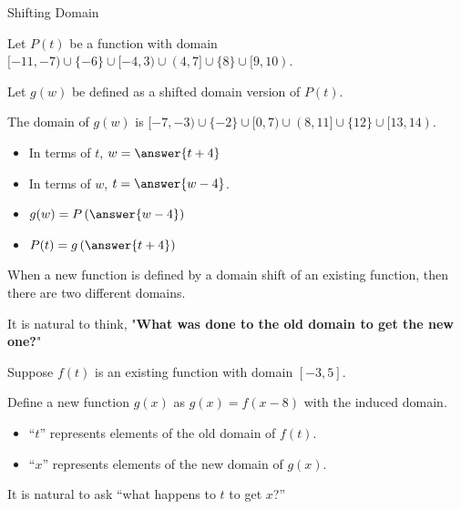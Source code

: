 \documentclass{ximera}
\begin{document}
\begin{example} Shifting Domain


Let $P(t)$ be a function with domain $[-11, -7) \cup \{ -6 \} \cup [-4,3) \cup (4, 7] \cup \{ 8 \} \cup [9, 10)$.

Let $g(w)$ be defined as a shifted domain version of $P(t)$.  

The domain of $g(w)$ is $[-7, -3) \cup \{ -2 \} \cup [0,7) \cup (8, 11] \cup \{ 12 \} \cup [13, 14)$.

\begin{itemize}
\item In terms of $t$, $w = \answer{t+4}$ 
\item In terms of $w$, $t = \answer{w-4}$.  
\end{itemize}


\begin{itemize}
\item $g(w) = P\left(\answer{w-4}\right)$ 
\item $P(t) = g\left(\answer{t+4}\right)$ 
\end{itemize}

\end{example}














When a new function is defined by a domain shift of an existing function, then there are two different domains.  


It is natural to think, "\textbf{\textcolor{purple!85!blue}{What was done to the old domain to get the new one?}}"

Suppose $f(t)$ is an existing function with domain $[-3, 5]$.

Define a new function $g(x)$ as $g(x) = f(x-8)$ with the induced domain.



\begin{itemize}
\item ``$t$'' represents elements of the old domain of $f(t)$.  
\item ``$x$'' represents elements of the new domain of $g(x)$.  
\end{itemize}




It is natural to ask ``what happens to $t$ to get $x$?''  
\end{document}
